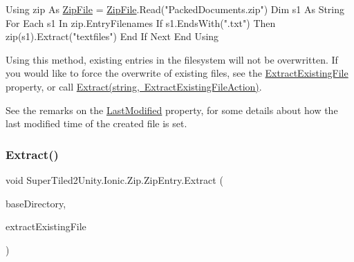 \begin{DoxyCode}
Using zip As \mbox{\hyperlink{namespace_super_tiled2_unity_1_1_ionic_1_1_zip_a9ced5352c56e7e0fceff15b534073c83a088ad16b06174c69965e232063ba6d16}{ZipFile}} = \mbox{\hyperlink{namespace_super_tiled2_unity_1_1_ionic_1_1_zip_a9ced5352c56e7e0fceff15b534073c83a088ad16b06174c69965e232063ba6d16}{ZipFile}}.Read(\textcolor{stringliteral}{"PackedDocuments.zip"})
    Dim s1 As String
    For Each s1 In zip.EntryFilenames
        If s1.EndsWith(\textcolor{stringliteral}{".txt"}) Then
            zip(s1).Extract(\textcolor{stringliteral}{"textfiles"})
        End If
    Next
End Using
\end{DoxyCode}
 

Using this method, existing entries in the filesystem will not be overwritten. If you would like to force the overwrite of existing files, see the \mbox{\hyperlink{class_super_tiled2_unity_1_1_ionic_1_1_zip_1_1_zip_entry_ad1ab903c29b91edb82e7c6a9768552dd}{Extract\+Existing\+File}} property, or call \mbox{\hyperlink{class_super_tiled2_unity_1_1_ionic_1_1_zip_1_1_zip_entry_a704fdbf9a9838692b6fbf4fa2991cca8}{Extract(string, Extract\+Existing\+File\+Action)}}. 

See the remarks on the \mbox{\hyperlink{class_super_tiled2_unity_1_1_ionic_1_1_zip_1_1_zip_entry_acd1234fd27c216b59c166c2b96aba3dd}{Last\+Modified}} property, for some details about how the last modified time of the created file is set. \mbox{\label{class_super_tiled2_unity_1_1_ionic_1_1_zip_1_1_zip_entry_a704fdbf9a9838692b6fbf4fa2991cca8}} 
\subsubsection{\texorpdfstring{Extract()}{Extract()}\hspace{0.1cm}{\footnotesize\ttfamily [5/5]}}
{\footnotesize\ttfamily void Super\+Tiled2\+Unity.\+Ionic.\+Zip.\+Zip\+Entry.\+Extract (\begin{DoxyParamCaption}\item[{string}]{base\+Directory,  }\item[{\mbox{\hyperlink{namespace_super_tiled2_unity_1_1_ionic_1_1_zip_a3f8db7242d746d36b45114257b4fe4c0}{Extract\+Existing\+File\+Action}}}]{extract\+Existing\+File }\end{DoxyParamCaption})}



